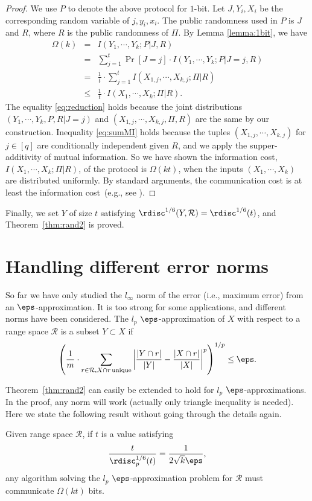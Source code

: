 \begin{proof}
We use $P$ to denote the above protocol for $1$-bit. Let $J,Y_i, X_i$ be the corresponding random variable of $j, y_i, x_i$.  The public randomness used in $P$ is $J$ and $R$, where $R$ is the public randomness of $\Pi$. By Lemma \ref{lemma:1bit}, we have
\begin{eqnarray}
\Omega(k) &=& I(Y_1,\cdots, Y_k; P|J,R) \nonumber \\
&=&\sum_{j=1}^t\Pr[J=j] \cdot I(Y_1,\cdots, Y_k; P|J=j,R) \nonumber \\
& = &\frac{1}{t}\cdot \sum_{j=1}^t I(X_{1,j},\cdots, X_{k,j}; \Pi|R) \label{eq:reduction}\\
&\le& \frac{1}{t}\cdot I(X_1,\cdots, X_k; \Pi|R). \label{eq:sumMI}
\end{eqnarray}
The equality \eqref{eq:reduction} holds because the joint distributions $(Y_1,\cdots, Y_k, P, R|J=j)$ and $(X_{1,j},\cdots, X_{k,j}, \Pi, R)$ are the same by our construction. Inequality \eqref{eq:sumMI} holds because the tuples $(X_{1,j},\cdots, X_{k,j})$ for $j\in [q]$ are conditionally independent given $R$, and we apply the supper-additivity of mutual information. So we have shown the information cost, $I(X_1,\cdots, X_k; \Pi|R)$, of the protocol is $\Omega(kt)$, when the inputs $(X_1,\cdots, X_k)$ are distributed uniformly. By standard arguments, the communication cost is at least the information cost~(e.g., see \cite{bar2004information}).
\end{proof}

Finally, we set $Y$ of size $t$ satisfying
$\rdisc^{1/6}(Y,\mathcal{R})=\rdisc^{1/6}(t)$, and Theorem~\ref{thm:rand2} is proved.


\section{Handling different error norms}\label{app:lp-norm}
So far we have only studied the $l_\infty$ norm of the error (i.e., maximum error) from an
$\eps$-approximation.  It is too strong for some applications, and different norms have
been considered.  The $l_p$ $\eps$-approximation of $X$ with respect to a range
space $\mathcal{R}$ is a subset $Y\subset X$ if 
$$\left(\frac{1}{m}\cdot\sum _{r\in \mathcal{R}, X\cap r\, \mathrm{ unique}}\left|\frac{|Y\cap r|}{|Y|} -\frac{|X\cap
      r|}{|X|}\right|^p\right)^{1/p}\le \eps.$$ 

Theorem~\ref{thm:rand2} can easily be extended to hold for $l_p$ $\eps$-approximations. In
the proof, any norm will work (actually only triangle inequality is needed).  Here we
state the following result without going through the details again.
\begin{theorem}
Given range space $\mathcal{R}$, if $t$ is a value satisfying  $$\frac{t}{\rdisc_p^{1/6}(t)} = \frac{1}{2\sqrt{k}\eps},$$ any algorithm solving the $l_p$ $\eps$-approximation problem for $\mathcal{R}$ must communicate $\Omega(kt)$ bits.
\end{theorem}

